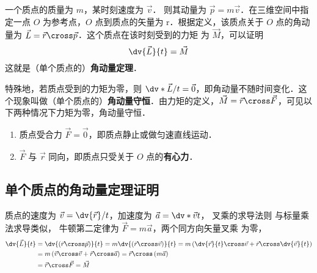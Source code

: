 

一个质点的质量为 $m$，某时刻速度为 $\vec v$． 则其动量为 $\vec p = m\vec v$．在三维空间中指定一点 $O$ 为参考点，$O$ 点到质点的矢量为 \vec r．根据定义，该质点关于 $O$ 点的角动量为 $\vec L = \vec r \cross \vec p$．这个质点在该时刻受到的力矩%
为 $\vec M$，可以证明
\begin{equation}
\dv{\vec L}{t} = \vec M
\end{equation} 
这就是（单个质点的）\textbf{角动量定理}．

特殊地，若质点受到的力矩为零，则 $ \dv*{\vec L}/{t} = \vec 0$，即角动量不随时间变化．这个现象叫做（单个质点的）\textbf{角动量守恒}．由力矩的定义，$\vec M = \vec r \cross \vec F$，可见以下两种情况下力矩为零，角动量守恒．
\begin{enumerate}
\item 质点受合力 $\vec F= \vec 0$，即质点静止或做匀速直线运动．
\item $\vec F$ 与 $\vec r$ 同向，即质点只受关于 $O$ 点的\textbf{有心力}．
\end{enumerate}

\subsection{单个质点的角动量定理证明}

质点的速度为 $\vec v = \dv{\vec r}/{t}$，加速度为 $\vec a = \dv*{\vec v}{t}$，
叉乘的求导法则%
与标量乘法求导类似，
牛顿第二定律为%
$\vec F = m\vec a$，两个同方向矢量叉乘%
 为零，
\begin{equation}
\begin{aligned}
\dv{\vec L}{t} &= \dv{\left( {\vec r \cross \vec p} \right)}{t} = m\dv{\left( {\vec r \cross \vec v} \right)}{t} = m\left( \dv{\vec r}{t} \cross \vec v + \vec r \cross \dv{\vec v}{t} \right)\\
&= m\left( {\vec v \cross \vec v + \vec r \cross \vec a} \right) = \vec r \cross \left( {m\vec a} \right)\\
&= \vec r \cross \vec F = \vec M
\end{aligned}
\end{equation}
 
